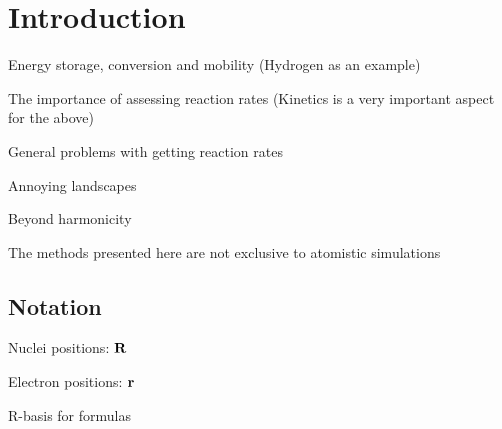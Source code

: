 \chapter{Introduction}
\label{chap:introduction}

\bit
\item Energy storage, conversion and mobility (Hydrogen as an example)
\item The importance of assessing reaction rates (Kinetics is a very important aspect for the above)
\item General problems with getting reaction rates
\item Annoying landscapes
\item Beyond harmonicity
\item The methods presented here are not exclusive to atomistic simulations
\eit

\placeholder

\section{Notation}
\bit
\item Nuclei positions: ${\mathrm{\mathbf{\bm{R}}}}$
\item Electron positions: ${\mathrm{\mathbf{\bm{r}}}}$
\item R-basis for formulas
\eit


